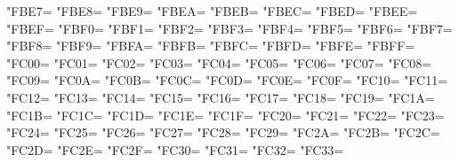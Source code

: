 \XeTeXcharclass"FBE7=\KclassArabU
\XeTeXcharclass"FBE8=\KclassArabU
\XeTeXcharclass"FBE9=\KclassArabU
\XeTeXcharclass"FBEA=\KclassArabU
\XeTeXcharclass"FBEB=\KclassArabU
\XeTeXcharclass"FBEC=\KclassArabU
\XeTeXcharclass"FBED=\KclassArabU
\XeTeXcharclass"FBEE=\KclassArabU
\XeTeXcharclass"FBEF=\KclassArabU
\XeTeXcharclass"FBF0=\KclassArabU
\XeTeXcharclass"FBF1=\KclassArabU
\XeTeXcharclass"FBF2=\KclassArabU
\XeTeXcharclass"FBF3=\KclassArabU
\XeTeXcharclass"FBF4=\KclassArabU
\XeTeXcharclass"FBF5=\KclassArabU
\XeTeXcharclass"FBF6=\KclassArabU
\XeTeXcharclass"FBF7=\KclassArabU
\XeTeXcharclass"FBF8=\KclassArabU
\XeTeXcharclass"FBF9=\KclassArabU
\XeTeXcharclass"FBFA=\KclassArabU
\XeTeXcharclass"FBFB=\KclassArabU
\XeTeXcharclass"FBFC=\KclassArabU
\XeTeXcharclass"FBFD=\KclassArabU
\XeTeXcharclass"FBFE=\KclassArabU
\XeTeXcharclass"FBFF=\KclassArabU
\XeTeXcharclass"FC00=\KclassArabU
\XeTeXcharclass"FC01=\KclassArabU
\XeTeXcharclass"FC02=\KclassArabU
\XeTeXcharclass"FC03=\KclassArabU
\XeTeXcharclass"FC04=\KclassArabU
\XeTeXcharclass"FC05=\KclassArabU
\XeTeXcharclass"FC06=\KclassArabU
\XeTeXcharclass"FC07=\KclassArabU
\XeTeXcharclass"FC08=\KclassArabU
\XeTeXcharclass"FC09=\KclassArabU
\XeTeXcharclass"FC0A=\KclassArabU
\XeTeXcharclass"FC0B=\KclassArabU
\XeTeXcharclass"FC0C=\KclassArabU
\XeTeXcharclass"FC0D=\KclassArabU
\XeTeXcharclass"FC0E=\KclassArabU
\XeTeXcharclass"FC0F=\KclassArabU
\XeTeXcharclass"FC10=\KclassArabU
\XeTeXcharclass"FC11=\KclassArabU
\XeTeXcharclass"FC12=\KclassArabU
\XeTeXcharclass"FC13=\KclassArabU
\XeTeXcharclass"FC14=\KclassArabU
\XeTeXcharclass"FC15=\KclassArabU
\XeTeXcharclass"FC16=\KclassArabU
\XeTeXcharclass"FC17=\KclassArabU
\XeTeXcharclass"FC18=\KclassArabU
\XeTeXcharclass"FC19=\KclassArabU
\XeTeXcharclass"FC1A=\KclassArabU
\XeTeXcharclass"FC1B=\KclassArabU
\XeTeXcharclass"FC1C=\KclassArabU
\XeTeXcharclass"FC1D=\KclassArabU
\XeTeXcharclass"FC1E=\KclassArabU
\XeTeXcharclass"FC1F=\KclassArabU
\XeTeXcharclass"FC20=\KclassArabU
\XeTeXcharclass"FC21=\KclassArabU
\XeTeXcharclass"FC22=\KclassArabU
\XeTeXcharclass"FC23=\KclassArabU
\XeTeXcharclass"FC24=\KclassArabU
\XeTeXcharclass"FC25=\KclassArabU
\XeTeXcharclass"FC26=\KclassArabU
\XeTeXcharclass"FC27=\KclassArabU
\XeTeXcharclass"FC28=\KclassArabU
\XeTeXcharclass"FC29=\KclassArabU
\XeTeXcharclass"FC2A=\KclassArabU
\XeTeXcharclass"FC2B=\KclassArabU
\XeTeXcharclass"FC2C=\KclassArabU
\XeTeXcharclass"FC2D=\KclassArabU
\XeTeXcharclass"FC2E=\KclassArabU
\XeTeXcharclass"FC2F=\KclassArabU
\XeTeXcharclass"FC30=\KclassArabU
\XeTeXcharclass"FC31=\KclassArabU
\XeTeXcharclass"FC32=\KclassArabU
\XeTeXcharclass"FC33=\KclassArabU
